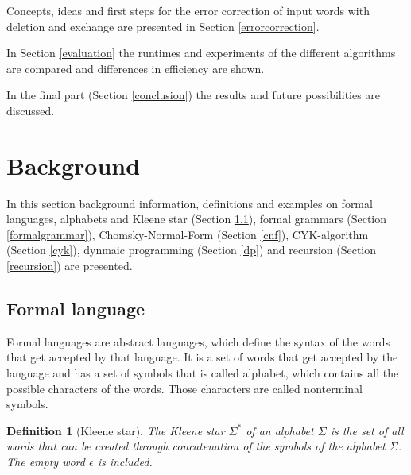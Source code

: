 \documentclass[a4paper, 11pt]{article}
\newtheorem*{definition*}{Definition}
\begin{document}
Concepts, ideas and first steps for the error correction of input words with deletion and exchange are presented in Section \ref{errorcorrection}.

In Section \ref{evaluation} the runtimes and experiments of the different algorithms are compared and differences in efficiency are shown.

In the final part (Section \ref{conclusion}) the results and future possibilities are discussed.




\pagebreak














\section{Background}

In this section background information, definitions and examples on formal languages, alphabets and Kleene star (Section \ref{formallanguage}), formal grammars (Section \ref{formalgrammar}), Chomsky-Normal-Form (Section \ref{cnf}), CYK-algorithm (Section \ref{cyk}), dynmaic programming (Section \ref{dp}) and recursion (Section \ref{recursion}) are presented. 


\subsection{Formal language}
\label{formallanguage}


Formal languages are abstract languages, which define the syntax of the words that get accepted by that language. It is a set of words that get accepted by the language and has a set of symbols that is called alphabet, which contains all the possible characters of the words. Those characters are called nonterminal symbols. \cite{CNF, language}

\begin{definition*}[Kleene star]
The Kleene star $\Sigma^*$ of an alphabet $\Sigma$ is the set of all words that can be created through concatenation of the symbols of the alphabet $\Sigma$. The empty word $\epsilon$ is included. 
\end{definition*}
\end{document}
